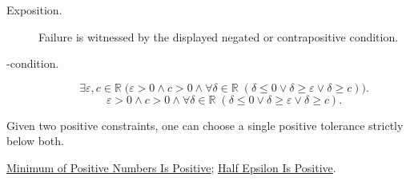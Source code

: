 \begin{remark*}
\begin{description}
  \item[Exposition.]
  Failure is witnessed by the displayed negated or contrapositive condition.

  \item[\exists-condition.]
  \[
\exists \varepsilon,c\in\mathbb{R}\;
\bigl(\varepsilon>0\land c>0\land
\forall\delta\in\mathbb{R}\;(\delta\leq 0\lor \delta\geq\varepsilon\lor \delta\geq c)\bigr).
\]
\[
\varepsilon>0\land c>0\land
\forall\delta\in\mathbb{R}\;(\delta\leq 0\lor \delta\geq\varepsilon\lor \delta\geq c).
\]
\end{description}
\end{remark*}
\begin{remark*}[Interpretation]
Given two positive constraints, one can choose a single positive tolerance
strictly below both.
\end{remark*}
\begin{dependencies}
\hyperref[lem:minimum-of-positive-numbers-is-positive]{Minimum of Positive Numbers Is Positive};
\hyperref[lem:half-epsilon-is-positive]{Half Epsilon Is Positive}.
\end{dependencies}
